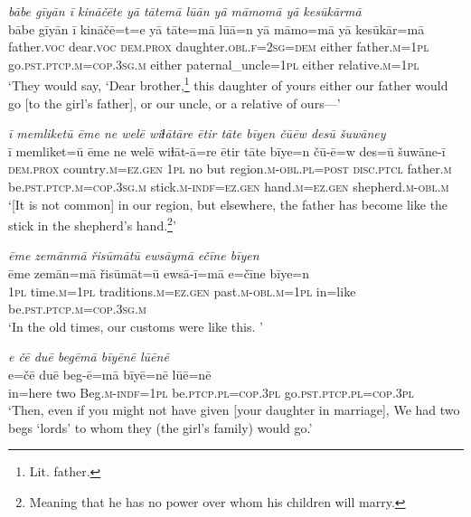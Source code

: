 \ea \label{RE.4}
\textit{bābe gīyān ī kināčēte yā tātemā lūān yā māmomā yā kesūkārmā} \\ 
\gll bābe gīyān ī kināčē=t=e yā tāte=mā lūā=n yā māmo=mā yā kesūkār=mā \\ 
 father.\textsc{voc} dear.\textsc{voc} \textsc{dem.prox} daughter\textsc{.obl}\textsc{.f}\textsc{=\textsc{2sg}}\textsc{=dem} either father\textsc{.m}\textsc{=\textsc{1pl}} go\textsc{.pst}\textsc{.ptcp}\textsc{.m}\textsc{=cop}\textsc{.3sg}\textsc{.m} either paternal\_uncle\textsc{=\textsc{1pl}} either relative\textsc{.m}\textsc{=\textsc{1pl}} \\ 
\glt `They would say, ‘Dear brother,\footnote{Lit. father.} this daughter of yours \—either our father would go [to the girl’s father], or our uncle, or a relative of ours—'
\z 
 
\ea \label{RE.41}
\textit{ī memliketū ēme ne welē wiɫātāre ētir tāte bīyen čūēw desū šuwāney} \\ 
\gll ī memliket=ū ēme ne welē wiɫāt-ā=re ētir tāte bīye=n čū-ē=w des=ū šuwāne-ī \\ 
 \textsc{dem.prox} country\textsc{.m}\textsc{=ez.gen} \textsc{1pl} no but region\textsc{.m}\textsc{-obl}\textsc{.pl}\textsc{=\textsc{post}} \textsc{disc.ptcl} father\textsc{.m} be\textsc{.pst}\textsc{.ptcp}\textsc{.m}\textsc{=cop}\textsc{.3sg}\textsc{.m} stick\textsc{.m}\textsc{-indf}\textsc{=ez.gen} hand\textsc{.m}\textsc{=ez.gen} shepherd\textsc{.m}\textsc{-obl}\textsc{.m} \\ 
\glt `[It is not common] in our region, but elsewhere, the father has become like the stick in the shepherd’s hand.\footnote{Meaning that he has no power over whom his children will marry.}'
\z 
 
\ea \label{RE.42}
\textit{ēme zemānmā řisūmātū ewsāymā ečīne bīyen} \\ 
\gll ēme zemān=mā řisūmāt=ū ewsā-ī=mā e=čīne bīye=n \\ 
 \textsc{1pl} time\textsc{.m}\textsc{=\textsc{1pl}} traditions\textsc{.m}\textsc{=ez.gen} past\textsc{.m}\textsc{-obl}\textsc{.m}\textsc{=\textsc{1pl}} in=like be\textsc{.pst}\textsc{.ptcp}\textsc{.m}\textsc{=cop}\textsc{.3sg}\textsc{.m} \\ 
\glt `In the old times, our customs were like this. '
\z 
 
\ea \label{RE.43}
\textit{e čē duē begēmā bīyēnē lūēnē} \\ 
\gll e=čē duē beg-ē=mā bīyē=nē lūē=nē \\ 
 in=here two Beg\textsc{.m}\textsc{-indf}\textsc{=\textsc{1pl}} be\textsc{.ptcp}\textsc{.pl}\textsc{=cop}\textsc{.3pl} go\textsc{.pst}\textsc{.ptcp}\textsc{.pl}\textsc{=cop}\textsc{.3pl} \\ 
\glt `Then, even if you might not have given [your daughter in marriage], We had two begs ‘lords’ to whom they (the girl's family) would go.'
\z 
 
